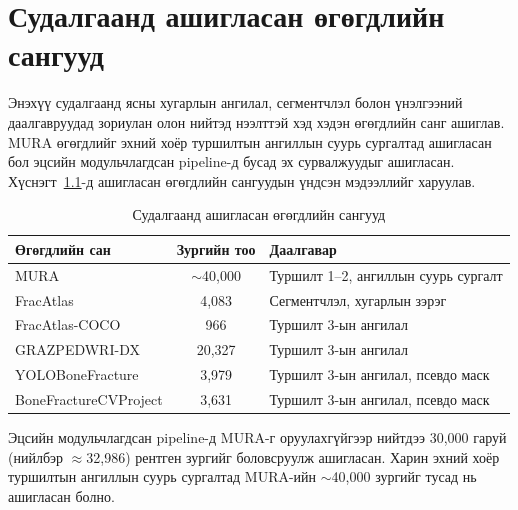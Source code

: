 
\chapter{Судалгаанд ашигласан өгөгдлийн сангууд}
\label{AppendixA}
\pagecolor{white}

Энэхүү судалгаанд ясны хугарлын ангилал, сегментчлэл болон үнэлгээний даалгавруудад зориулан олон нийтэд нээлттэй хэд хэдэн өгөгдлийн санг ашиглав. MURA өгөгдлийг эхний хоёр туршилтын ангиллын суурь сургалтад ашигласан бол эцсийн модульчлагдсан pipeline-д бусад эх сурвалжуудыг ашигласан. Хүснэгт~\ref{tab:appA_datasets}-д ашигласан өгөгдлийн сангуудын үндсэн мэдээллийг харуулав.

\begin{table}[ht]
    \centering
    \begin{tabular}{|l|c|l|}
    \hline
    \textbf{Өгөгдлийн сан} & \textbf{Зургийн тоо} & \textbf{Даалгавар} \\ \hline
    MURA                  & $\sim$40{,}000 & Туршилт 1--2, ангиллын суурь сургалт \\ \hline
    FracAtlas             & 4{,}083  & Сегментчлэл, хугарлын зэрэг \\ \hline
    FracAtlas-COCO        & 966      & Туршилт 3-ын ангилал \\ \hline
    GRAZPEDWRI-DX         & 20{,}327 & Туршилт 3-ын ангилал \\ \hline
    YOLOBoneFracture      & 3{,}979  & Туршилт 3-ын ангилал, псевдо маск \\ \hline
    BoneFractureCVProject & 3{,}631  & Туршилт 3-ын ангилал, псевдо маск \\ \hline
    \end{tabular}
    \caption{Судалгаанд ашигласан өгөгдлийн сангууд}
    \label{tab:appA_datasets}
\end{table}

Эцсийн модульчлагдсан pipeline-д MURA-г оруулахгүйгээр нийтдээ 30{,}000 гаруй (нийлбэр $\approx$32{,}986) рентген зургийг боловсруулж ашигласан. Харин эхний хоёр туршилтын ангиллын суурь сургалтад MURA-ийн $\sim$40{,}000 зургийг тусад нь ашигласан болно.
